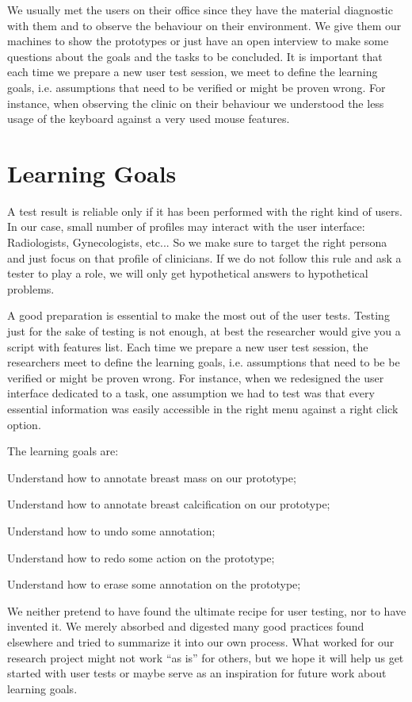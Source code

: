 We usually met the users on their office since they have the material diagnostic with them and to observe the behaviour on their environment. We give them our machines to show the prototypes or just have an open interview to make some questions about the goals and the tasks to be concluded. It is important that each time we prepare a new user test session, we meet to define the learning goals, i.e. assumptions that need to be verified or might be proven wrong. For instance, when observing the clinic on their behaviour we understood the less usage of the keyboard against a very used mouse features.

\clearpage

\section{Learning Goals}

A test result is reliable only if it has been performed with the right kind of users. In our case, small number of profiles may interact with the user interface: Radiologists, Gynecologists, etc... So we make sure to target the right persona and just focus on that profile of clinicians. If we do not follow this rule and ask a tester to play a role, we will only get hypothetical answers to hypothetical problems.

A good preparation is essential to make the most out of the user tests. Testing just for the sake of testing is not enough, at best the researcher would give you a script with features list. Each time we prepare a new user test session, the researchers meet to define the learning goals, i.e. assumptions that need to be be verified or might be proven wrong. For instance, when we redesigned the user interface dedicated to a task, one assumption we had to test was that every essential information was easily accessible in the right menu against a right click option.

The learning goals are:

 Understand how to annotate breast mass on our prototype;

 Understand how to annotate breast calcification on our prototype;

 Understand how to undo some annotation;

 Understand how to redo some action on the prototype;

 Understand how to erase some annotation on the prototype;

We neither pretend to have found the ultimate recipe for user testing, nor to have invented it. We merely absorbed and digested many good practices found elsewhere and tried to summarize it into our own process. What worked for our research project might not work “as is” for others, but we hope it will help us get started with user tests or maybe serve as an inspiration for future work about learning goals.


